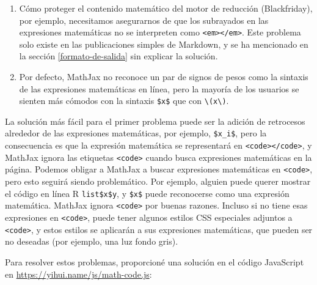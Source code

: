 \documentclass[12pt,]{krantz}
\theoremstyle{definition}
\theoremstyle{definition}
\theoremstyle{definition}
\theoremstyle{remark}
\begin{document}
\begin{enumerate}
\def\labelenumi{\arabic{enumi}.}
\item
  Cómo proteger el contenido matemático del motor de reducción
  (Blackfriday), por ejemplo, necesitamos asegurarnos de que los
  subrayados en las expresiones matemáticas no se interpreten como
  \texttt{\textless{}em\textgreater{}\textless{}/em\textgreater{}}. Este
  problema solo existe en las publicaciones simples de Markdown, y se ha
  mencionado en la sección \ref{formato-de-salida} sin explicar la
  solución.
\item
  Por defecto, MathJax no reconoce un par de signos de pesos como la
  sintaxis de las expresiones matemáticas en línea, pero la mayoría de
  los usuarios se sienten más cómodos con la sintaxis \texttt{\$x\$} que
  con \texttt{\textbackslash{}(x\textbackslash{})}.
\end{enumerate}

La solución más fácil para el primer problema puede ser la adición de
retrocesos alrededor de las expresiones matemáticas, por ejemplo,
\texttt{\textasciigrave{}\$x\_i\$\textasciigrave{}}, pero la
consecuencia es que la expresión matemática se representará en
\texttt{\textless{}code\textgreater{}\textless{}/code\textgreater{}}, y
MathJax ignora las etiquetas \texttt{\textless{}code\textgreater{}}
cuando busca expresiones matemáticas en la página. Podemos obligar a
MathJax a buscar expresiones matemáticas en
\texttt{\textless{}code\textgreater{}}, pero esto seguirá siendo
problemático. Por ejemplo, alguien puede querer mostrar el código en
línea R \texttt{\textasciigrave{}list\$x\$y\textasciigrave{}}, y
\texttt{\$x\$} puede reconocerse como una expresión matemática. MathJax
ignora \texttt{\textless{}code\textgreater{}} por buenas razones.
Incluso si no tiene esas expresiones en
\texttt{\textless{}code\textgreater{}}, puede tener algunos estilos CSS
especiales adjuntos a \texttt{\textless{}code\textgreater{}}, y estos
estilos se aplicarán a sus expresiones matemáticas, que pueden ser no
deseadas (por ejemplo, una luz fondo gris).

Para resolver estos problemas, proporcioné una solución en el código
JavaScript en \url{https://yihui.name/js/math-code.js}:
\end{document}
